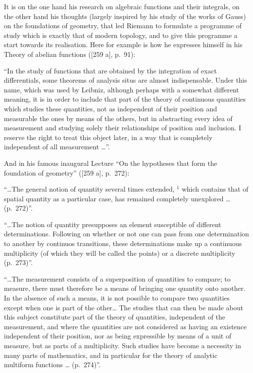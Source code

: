 It is on the one hand his research on algebraic functions and their integrals, on the other hand his thoughts (largely inspired by his study of the works of Gauss) on the foundations of geometry, that led Riemann to formulate a programme of study which is exactly that of modern topology, and to give this programme a start towards its realisation. Here for example is how he expresses himself in his Theory of abelian functions ({[}259 a{]}, p.~91):

``In the study of functions that are obtained by the integration of exact differentials, some theorems of analysis situs are almost indispensable. Under this name, which was used by Leibniz, although perhaps with a somewhat different meaning, it is in order to include that part of the theory of continuous quantities which studies these quantities, not as independent of their position and measurable the ones by means of the others, but in abstracting every idea of measurement and studying solely their relationships of position and inclusion. I reserve the right to treat this object later, in a way that is completely independent of all measurement \ldots{}''.

And in his famous inaugural Lecture ``On the hypotheses that form the foundation of geometry'' ({[}259 a{]}, p.~272):

``\ldots The general notion of quantity several times extended, \(^{1}\) which contains that of spatial quantity as a particular case, has remained completely unexplored \ldots{} (p.~272)''.

``\ldots The notion of quantity presupposes an element susceptible of different determinations. Following on whether or not one can pass from one determination to another by continuos transitions, these determinations make up a continuous multiplicity (of which they will be called the points) or a discrete multiplicity (p.~273)''.

``\ldots The measurement consists of a superposition of quantities to compare; to measure, there must therefore be a means of bringing one quantity onto another. In the absence of such a means, it is not possible to compare two quantities except when one is part of the other\ldots{} The studies that can then be made about this subject constitute part of the theory of quantities, independent of the measurement, and where the quantities are not considered as having an existence independent of their position, nor as being expressible by means of a unit of measure, but as parts of a multiplicity. Such studies have become a necessity in many parts of mathematics, and in particular for the theory of analytic multiform functions \ldots{} (p.~274)''.

